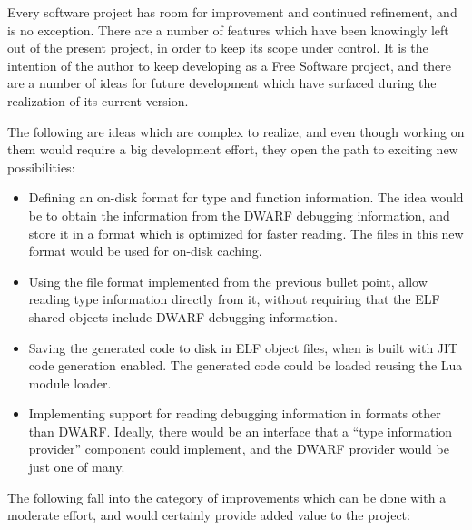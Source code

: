 Every software project has room for improvement and continued refinement, and
\Eol* is no exception. There are a number of features which have been
knowingly left out of the present project, in order to keep its scope under
control. It is the intention of the author to keep developing \Eol* as a Free
Software project, and there are a number of ideas for future development which
have surfaced during the realization of its current version.

The following are ideas which are complex to realize, and even though working
on them would require a big development effort, they open the path to exciting
new possibilities:

\begin{itemize}

	\item Defining an on-disk format for type and function information. The
	idea would be to obtain the information from the DWARF debugging
	information, and store it in a format which is optimized for faster
	reading. The files in this new format would be used for on-disk caching.

	\item Using the file format implemented from the previous bullet point,
	allow reading type information directly from it, without requiring that
	the ELF shared objects include DWARF debugging information.

	\item Saving the generated code to disk in ELF object files, when \Eol* is
	built with JIT code generation enabled.	The generated code could be loaded
	reusing the Lua module loader.

	\item Implementing support for reading debugging information in formats
	other than DWARF. Ideally, there would be an interface that a “type
	information provider” component could implement, and the DWARF provider
	would be just one of many.

\end{itemize}

The following fall into the category of improvements which can be done with
a moderate effort, and would certainly provide added value to the project:

